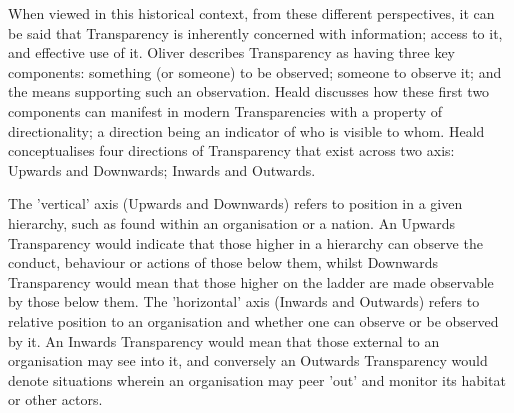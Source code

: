 When viewed in this historical context, from these different perspectives, it can be said that Transparency is inherently concerned with information; access to it, and effective use of it. Oliver describes Transparency as having three key components: something (or someone) to be observed; someone to observe it; and the means supporting such an observation. Heald discusses how these first two components can manifest in modern Transparencies with a property of directionality; a direction being an indicator of who is visible to whom. Heald conceptualises four directions of Transparency that exist across two axis: Upwards and Downwards; Inwards and Outwards.

The 'vertical' axis (Upwards and Downwards) refers to position in a given hierarchy, such as found within an organisation or a nation. An Upwards Transparency would indicate that those higher in a hierarchy can observe the conduct, behaviour or actions of those below them, whilst Downwards Transparency would mean that those higher on the ladder are made observable by those below them. The 'horizontal' axis (Inwards and Outwards) refers to relative position to an organisation and whether one can observe or be observed by it. An Inwards Transparency would mean that those external to an organisation may see into it, and conversely an Outwards Transparency would denote situations wherein an organisation may peer 'out' and monitor its habitat or other actors.

